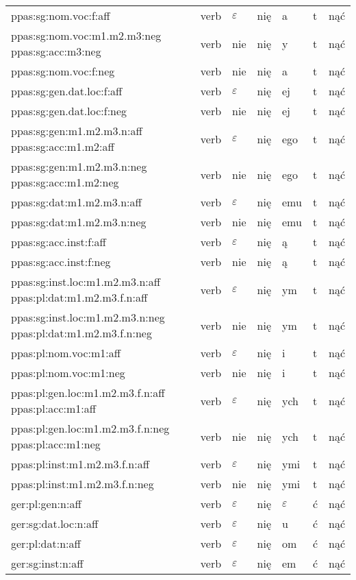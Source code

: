\documentclass{article}
\begin{document}
\begin{longtable}{p{7cm}|l|l|l|l|l|l}
ppas:sg:nom.voc:f:aff & verb & $\varepsilon$ & nię & a & t & nąć\\
ppas:sg:nom.voc:m1.m2.m3:neg ppas:sg:acc:m3:neg & verb & nie & nię & y & t & nąć\\
ppas:sg:nom.voc:f:neg & verb & nie & nię & a & t & nąć\\
ppas:sg:gen.dat.loc:f:aff & verb & $\varepsilon$ & nię & ej & t & nąć\\
ppas:sg:gen.dat.loc:f:neg & verb & nie & nię & ej & t & nąć\\
ppas:sg:gen:m1.m2.m3.n:aff ppas:sg:acc:m1.m2:aff & verb & $\varepsilon$ & nię & ego & t & nąć\\
ppas:sg:gen:m1.m2.m3.n:neg ppas:sg:acc:m1.m2:neg & verb & nie & nię & ego & t & nąć\\
ppas:sg:dat:m1.m2.m3.n:aff & verb & $\varepsilon$ & nię & emu & t & nąć\\
ppas:sg:dat:m1.m2.m3.n:neg & verb & nie & nię & emu & t & nąć\\
ppas:sg:acc.inst:f:aff & verb & $\varepsilon$ & nię & ą & t & nąć\\
ppas:sg:acc.inst:f:neg & verb & nie & nię & ą & t & nąć\\
ppas:sg:inst.loc:m1.m2.m3.n:aff ppas:pl:dat:m1.m2.m3.f.n:aff & verb & $\varepsilon$ & nię & ym & t & nąć\\
ppas:sg:inst.loc:m1.m2.m3.n:neg ppas:pl:dat:m1.m2.m3.f.n:neg & verb & nie & nię & ym & t & nąć\\
ppas:pl:nom.voc:m1:aff & verb & $\varepsilon$ & nię & i & t & nąć\\
ppas:pl:nom.voc:m1:neg & verb & nie & nię & i & t & nąć\\
ppas:pl:gen.loc:m1.m2.m3.f.n:aff ppas:pl:acc:m1:aff & verb & $\varepsilon$ & nię & ych & t & nąć\\
ppas:pl:gen.loc:m1.m2.m3.f.n:neg ppas:pl:acc:m1:neg & verb & nie & nię & ych & t & nąć\\
ppas:pl:inst:m1.m2.m3.f.n:aff & verb & $\varepsilon$ & nię & ymi & t & nąć\\
ppas:pl:inst:m1.m2.m3.f.n:neg & verb & nie & nię & ymi & t & nąć\\
ger:pl:gen:n:aff & verb & $\varepsilon$ & nię & $\varepsilon$ & ć & nąć\\
ger:sg:dat.loc:n:aff & verb & $\varepsilon$ & nię & u & ć & nąć\\
ger:pl:dat:n:aff & verb & $\varepsilon$ & nię & om & ć & nąć\\
ger:sg:inst:n:aff & verb & $\varepsilon$ & nię & em & ć & nąć\\

\end{longtable}
\end{document}
